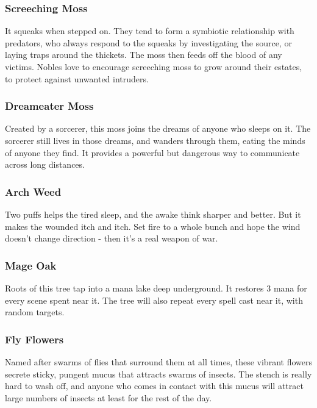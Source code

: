 \begin{multicols}{2}
\subsubsection{Screeching Moss}

It squeaks when stepped on.
They tend to form a symbiotic relationship with predators, who always respond to the squeaks by investigating the source, or laying traps around the thickets.
The moss then feeds off the blood of any victims.
Nobles love to encourage screeching moss to grow around their estates, to protect against unwanted intruders.

\subsubsection{Dreameater Moss}

Created by a sorcerer, this moss joins the dreams of anyone who sleeps on it.
The sorcerer still lives in those dreams, and wanders through them, eating the minds of anyone they find.
It provides a powerful but dangerous way to communicate across long distances.

\subsubsection{Arch Weed}

Two puffs helps the tired sleep, and the awake think sharper and better.
But it makes the wounded itch and itch.
Set fire to a whole bunch and hope the wind doesn't change direction - then it's a real weapon of war.

\subsubsection{Mage Oak}

Roots of this tree tap into a mana lake deep underground. It restores 3 mana for every scene spent near it. The tree will also repeat 
every spell cast near it, with random targets.

\subsubsection{Fly Flowers}

Named after swarms of flies that surround them at all times, these vibrant flowers secrete sticky, pungent mucus that attracts swarms 
of insects. The stench is really hard to wash off, and anyone who comes in contact with this mucus will attract large numbers of 
insects at least for the rest of the day.


\end{multicols}
